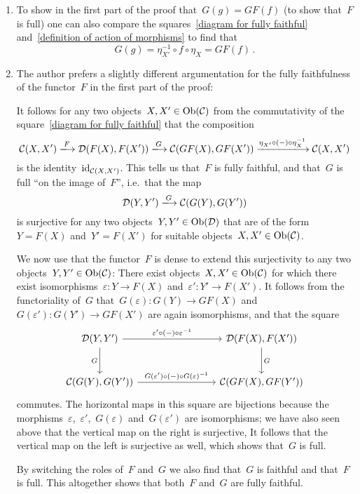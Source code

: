 \begin{remark*}
  \leavevmode
  \begin{enumerate}
    \item
      To show in the first part of the proof that~$G(g) = GF(f)$ (to show that~$F$ is full) one can also compare the squares~\eqref{diagram for fully faithful} and~\eqref{definition of action of morphisms} to find that
      \[
          G(g)
        = \eta_{X'}^{-1} \circ f \circ \eta_X
        = GF(f) \,.
      \]
    \item
      The author prefers a slightly different argumentation for the fully faithfulness of the functor~$F$ in the first part of the proof:
      
      It follows for any two objects~$X, X' \in \operatorname{Ob}(\mathcal{C})$ from the commutativity of the square~\eqref{diagram for fully faithful} that the composition
      \[
          \Ccat(X, X')
        \xlongto{F}
          \Dcat(F(X), F(X'))
        \xlongto{G}
          \Ccat(GF(X), GF(X'))
        \xlongto{\eta_{X'} \circ (-) \circ \eta^{-1}_X}
          \Ccat(X, X')
      \]
      is the identity~$\operatorname{id}_{\mathcal{C}(X,X')}$.
      This tells us that~$F$ is fully faithful, and that~$G$ is full \enquote{on the image of~$F$}, i.e.\ that the map
      \[
          \Dcat(Y, Y')
        \xlongto{G}
          \Ccat(G(Y), G(Y'))
      \]
      is surjective for any two objects~$Y, Y' \in \operatorname{Ob}(\mathcal{D})$ that are of the form~$Y = F(X)$ and~$Y' = F(X')$ for suitable objects~$X, X' \in \operatorname{Ob}(\mathcal{C})$.
      
      We now use that the functor~$F$ is dense to extend this surjectivity to any two objects~$Y, Y' \in \operatorname{Ob}(\mathcal{C})$:
      There exist objects~$X, X' \in \operatorname{Ob}(\mathcal{C})$ for which there exist isomorphisms~$\varepsilon \colon Y \to F(X)$ and~$\varepsilon' \colon Y' \to F(X')$.
      It follows from the functoriality of~$G$ that~$G(\varepsilon) \colon G(Y) \to GF(X)$ and~$G(\varepsilon') \colon G(Y') \to GF(X')$ are again isomorphisms, and that the square
      \[
        \begin{tikzcd}[row sep = large, column sep = 8em]
            \Dcat(Y, Y')
            \arrow{r}[above]{\varepsilon' \circ (-) \circ \varepsilon^{-1}}
            \arrow{d}[left]{G}
          & \Dcat(F(X), F(X'))
            \arrow{d}[right]{G}
          \\
            \Ccat(G(Y), G(Y'))
            \arrow{r}[above]{G(\varepsilon') \circ (-) \circ G(\varepsilon)^{-1}}
          & \Ccat(GF(X), GF(Y'))
        \end{tikzcd}
      \]
      commutes.
      The horizontal maps in this square are bijections because the morphisms~$\varepsilon$,~$\varepsilon'$,~$G(\varepsilon)$ and~$G(\varepsilon')$ are isomorphisms;
      we have also seen above that the vertical map on the right is surjective, 
      It follows that the vertical map on the left is surjective as well, which shows that~$G$ is full.
      
      By switching the roles of~$F$ and~$G$ we also find that~$G$ is faithful and that~$F$ is full.
      This altogether shows that both~$F$ and~$G$ are fully faithful.
  \end{enumerate}
\end{remark*}




